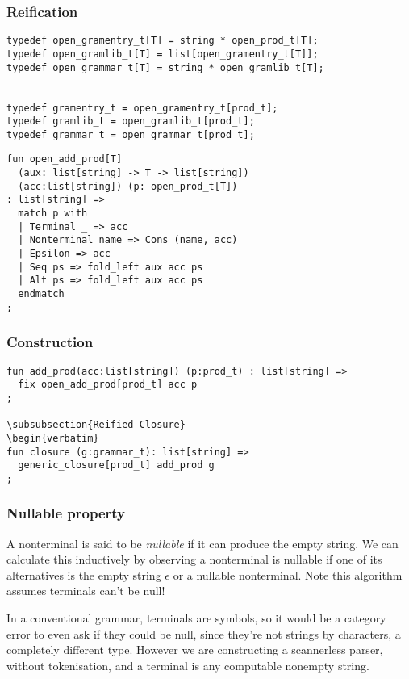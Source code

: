 \documentclass[oneside]{book}
\begin{document}
\subsubsection{Reification}
\begin{verbatim}
typedef open_gramentry_t[T] = string * open_prod_t[T];
typedef open_gramlib_t[T] = list[open_gramentry_t[T]];
typedef open_grammar_t[T] = string * open_gramlib_t[T];


typedef gramentry_t = open_gramentry_t[prod_t];
typedef gramlib_t = open_gramlib_t[prod_t];
typedef grammar_t = open_grammar_t[prod_t];
\end{verbatim}

\begin{verbatim}
fun open_add_prod[T] 
  (aux: list[string] -> T -> list[string])
  (acc:list[string]) (p: open_prod_t[T]) 
: list[string] =>
  match p with
  | Terminal _ => acc
  | Nonterminal name => Cons (name, acc) 
  | Epsilon => acc
  | Seq ps => fold_left aux acc ps
  | Alt ps => fold_left aux acc ps
  endmatch
;
\end{verbatim}

\subsubsection{Construction}
\begin{verbatim}
fun add_prod(acc:list[string]) (p:prod_t) : list[string] =>
  fix open_add_prod[prod_t] acc p
;

\subsubsection{Reified Closure}
\begin{verbatim}
fun closure (g:grammar_t): list[string] =>
  generic_closure[prod_t] add_prod g
;
\end{verbatim}

\subsubsection{Nullable property}
A nonterminal is said to be {\em nullable} if it can produce
the empty string. We can calculate this inductively by observing
a nonterminal is nullable if one of its alternatives is the empty
string $\epsilon$ or a nullable nonterminal. Note this algorithm
assumes terminals can't be null!

In a conventional grammar, terminals are symbols, so it would be a
category error to even ask if they could be null, since they're not
strings by characters, a completely different type. However
we are constructing a scannerless parser, without tokenisation,
and a terminal is any computable nonempty string.
\end{document}
